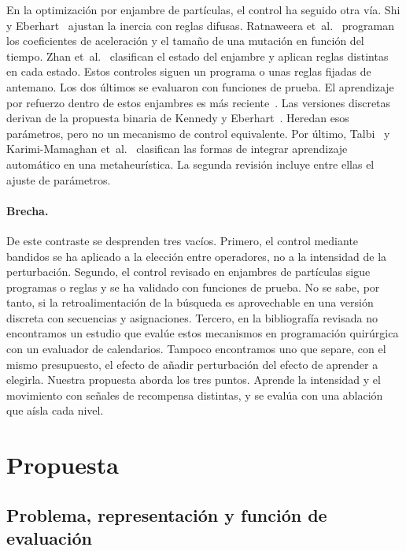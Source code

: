 \documentclass[10pt,a4paper]{article}
\begin{document}
En la optimización por enjambre de partículas, el control ha seguido otra vía. Shi y
Eberhart~\cite{shi2001} ajustan la inercia con reglas difusas. Ratnaweera
et~al.~\cite{ratnaweera2004} programan los coeficientes de aceleración y el tamaño de una
mutación en función del tiempo. Zhan et~al.~\cite{zhan2009} clasifican el estado del enjambre
y aplican reglas distintas en cada estado. Estos controles siguen un programa o unas
reglas fijadas de antemano. Los dos últimos se evaluaron con funciones de prueba. El aprendizaje por refuerzo dentro
de estos enjambres es más reciente~\cite{samma2016}. Las versiones discretas derivan de la
propuesta binaria de Kennedy y Eberhart~\cite{kennedy1997}. Heredan esos parámetros, pero no
un mecanismo de control equivalente. Por último, Talbi~\cite{talbi2021} y Karimi-Mamaghan et~al.~\cite{karimi2022} clasifican las
formas de integrar aprendizaje automático en una metaheurística. La segunda revisión incluye
entre ellas el ajuste de parámetros.

\paragraph{Brecha.}
De este contraste se desprenden tres vacíos. Primero, el control mediante bandidos se ha
aplicado a la elección entre operadores, no a la intensidad de la perturbación. Segundo, el
control revisado en enjambres de partículas sigue programas o reglas y se ha validado con
funciones de prueba. No se sabe, por tanto, si la
retroalimentación de la búsqueda es aprovechable en una versión discreta con secuencias y
asignaciones. Tercero, en la bibliografía revisada no encontramos un estudio que evalúe estos
mecanismos en programación quirúrgica con un evaluador de calendarios. Tampoco encontramos uno
que separe, con el mismo presupuesto, el efecto de añadir perturbación del efecto de aprender a
elegirla. Nuestra propuesta aborda los tres puntos. Aprende la intensidad y el movimiento con
señales de recompensa distintas, y se evalúa con una ablación que aísla cada nivel.

\section{Propuesta}

\subsection{Problema, representación y función de evaluación}
\end{document}
